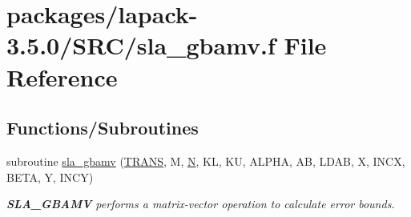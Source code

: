 \hypertarget{sla__gbamv_8f}{}\section{packages/lapack-\/3.5.0/\+S\+R\+C/sla\+\_\+gbamv.f File Reference}
\label{sla__gbamv_8f}
\subsection*{Functions/\+Subroutines}
\begin{DoxyCompactItemize}
\item 
subroutine \hyperlink{group__realGBcomputational_ga2ec4f3b65681172c1dd786df6580b176}{sla\+\_\+gbamv} (\hyperlink{superlu__enum__consts_8h_a0c4e17b2d5cea33f9991ccc6a6678d62a1f61e3015bfe0f0c2c3fda4c5a0cdf58}{T\+R\+A\+N\+S}, M, \hyperlink{polmisc_8c_a0240ac851181b84ac374872dc5434ee4}{N}, K\+L, K\+U, A\+L\+P\+H\+A, A\+B, L\+D\+A\+B, X, I\+N\+C\+X, B\+E\+T\+A, Y, I\+N\+C\+Y)
\begin{DoxyCompactList}\small\item\em {\bfseries S\+L\+A\+\_\+\+G\+B\+A\+M\+V} performs a matrix-\/vector operation to calculate error bounds. \end{DoxyCompactList}\end{DoxyCompactItemize}
